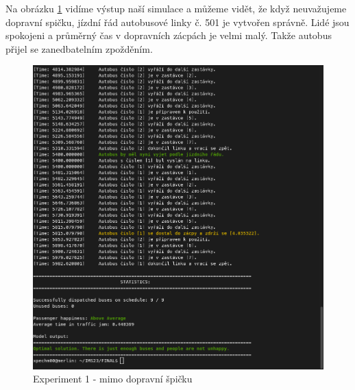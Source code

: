 \documentclass[a4paper]{article}
\begin{document}
                \begin{table}[H]
                    \centering
                    \caption{Výsledek experimentu 1}
                    \label{tab:experiment1}
                \end{table}

                Na obrázku \ref{fig:experiment1} vidíme výstup naší simulace a můžeme vidět, že když neuvažujeme dopravní spičku, jízdní řád autobusové linky č. 501 je vytvořen správně. Lidé jsou spokojeni a průměrný čas v dopravních zácpách je velmi malý. Takže autobus přijel se zanedbatelním zpožděním.

                \begin{figure}[H]
                \includegraphics[scale=0.45, keepaspectratio]{fig/ims_bus1.png}
                \caption{Experiment 1 - mimo dopravní špičku}
                \label{fig:experiment1}
            \end{figure}
        \newpage
\end{document}
